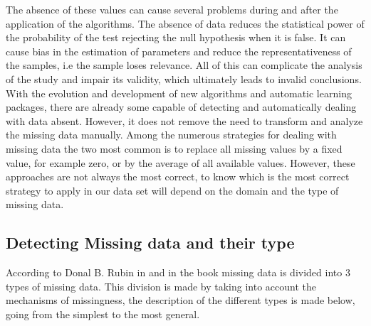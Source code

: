 The absence of these values can cause several problems during and after the application of the algorithms. The absence of data reduces the statistical power of the probability of the test rejecting the null hypothesis when it is false. It can cause bias in the estimation of parameters and reduce the representativeness of the samples, i.e the sample loses relevance. All of this can complicate the analysis of the study and impair its validity, which ultimately leads to invalid conclusions.\cite{Hang} With the evolution and development of new algorithms and automatic learning packages, there are already some capable of detecting and automatically dealing with data absent. However, it does not remove the need to transform and analyze the missing data manually. Among the numerous strategies for dealing with missing data the two most common is to replace all missing values by a fixed value, for example zero, or by the average of all available values. However, these approaches are not always the most correct, to know which is the most correct strategy to apply in our data set will depend on the domain and the type of missing data.


\subsection{Detecting Missing data and their type} %
\label{sec:document_structure}
\hspace{10px}According to Donal B. Rubin in \cite{Rubin} and in the book \cite{Berthold} missing data is divided into 3 types of missing data. This division is made by taking into account the mechanisms of missingness, the description of the different types is made below, going from the simplest to the most general.

